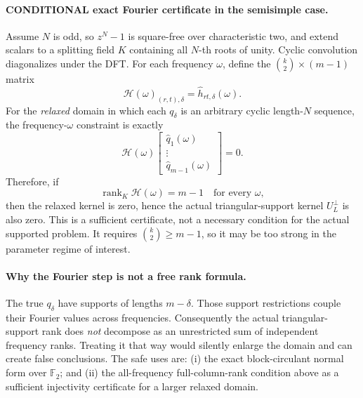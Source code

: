 \documentclass[11pt]{article}
\begin{document}
\paragraph{CONDITIONAL exact Fourier certificate in the semisimple case.}
Assume \(N\) is odd, so \(z^N-1\) is square-free over characteristic two, and extend scalars to a splitting field \(K\) containing all \(N\)-th roots of unity. Cyclic convolution diagonalizes under the DFT. For each frequency \(\omega\), define the \(\binom{k}{2}\times(m-1)\) matrix
\[
\mathcal H(\omega)_{(r,t),\delta}
=
\widehat h_{rt,\delta}(\omega).
\]
For the \emph{relaxed} domain in which each \(q_\delta\) is an arbitrary cyclic length-\(N\) sequence, the frequency-\(\omega\) constraint is exactly
\[
\boxed{
\mathcal H(\omega)
\begin{bmatrix}
\widehat q_1(\omega)\\ \vdots\\ \widehat q_{m-1}(\omega)
\end{bmatrix}=0.
}
\]
Therefore, if
\[
\boxed{\operatorname{rank}_K\mathcal H(\omega)=m-1\quad\text{for every }\omega,}
\]
then the relaxed kernel is zero, hence the actual triangular-support kernel \(U_L^\perp\) is also zero. This is a sufficient certificate, not a necessary condition for the actual supported problem. It requires \(\binom{k}{2}\ge m-1\), so it may be too strong in the parameter regime of interest.

\paragraph{Why the Fourier step is not a free rank formula.}
The true \(q_\delta\) have supports of lengths \(m-\delta\). Those support restrictions couple their Fourier values across frequencies. Consequently the actual triangular-support rank does \emph{not} decompose as an unrestricted sum of independent frequency ranks. Treating it that way would silently enlarge the domain and can create false conclusions. The safe uses are: (i) the exact block-circulant normal form over \(\mathbb F_2\); and (ii) the all-frequency full-column-rank condition above as a sufficient injectivity certificate for a larger relaxed domain.
\end{document}
